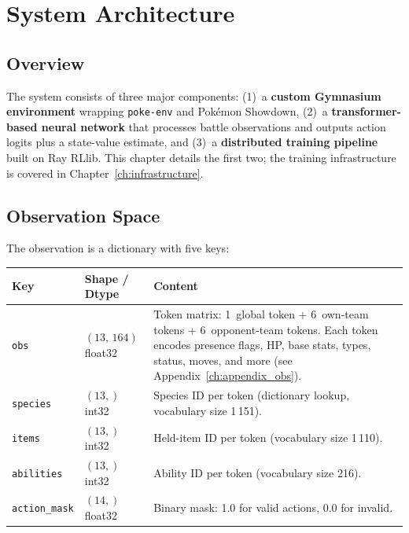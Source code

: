 \chapter{System Architecture}
\label{ch:architecture}

\section{Overview}

The system consists of three major components: (1)~a \textbf{custom Gymnasium
environment} wrapping \texttt{poke-env} and Pok\'{e}mon Showdown, (2)~a
\textbf{transformer-based neural network} that processes battle observations
and outputs action logits plus a state-value estimate, and (3)~a
\textbf{distributed training pipeline} built on Ray RLlib.  This chapter
details the first two; the training infrastructure is covered in
Chapter~\ref{ch:infrastructure}.

\section{Observation Space}

The observation is a dictionary with five keys:

\begin{center}
\small
\begin{tabularx}{\textwidth}{l l X}
  \toprule
  \textbf{Key} & \textbf{Shape / Dtype} & \textbf{Content} \\
  \midrule
  \texttt{obs}          & $(13,\,164)$ float32 &
    Token matrix: 1~global token + 6~own-team tokens + 6~opponent-team
    tokens.  Each token encodes presence flags, HP, base stats, types,
    status, moves, and more (see Appendix~\ref{ch:appendix_obs}). \\
  \texttt{species}      & $(13,)$ int32 &
    Species ID per token (dictionary lookup, vocabulary size 1\,151). \\
  \texttt{items}        & $(13,)$ int32 &
    Held-item ID per token (vocabulary size 1\,110). \\
  \texttt{abilities}    & $(13,)$ int32 &
    Ability ID per token (vocabulary size 216). \\
  \texttt{action\_mask} & $(14,)$ float32 &
    Binary mask: 1.0 for valid actions, 0.0 for invalid. \\
  \bottomrule
\end{tabularx}
\end{center}

